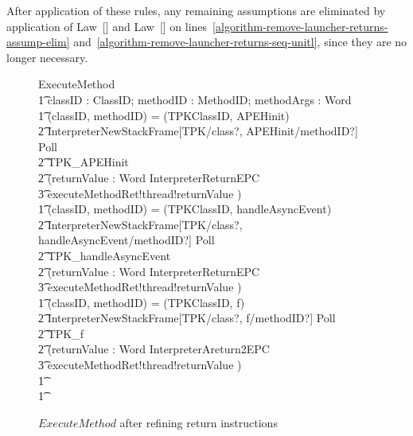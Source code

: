 After application of these rules, any remaining assumptions are
eliminated by application of Law~[] and
Law~[] on
lines~\ref{algorithm-remove-launcher-returns-assump-elim}
and~\ref{algorithm-remove-launcher-returns-seq-unitl}, since they are
no longer necessary.

\begin{figure}[tp!]
  \centering
  \setlength{\zedtab}{0.6cm}
  \begin{circusaction}
    ExecuteMethod \circdef \\
    \t1 \circval classID : ClassID; \circval methodID : MethodID; \circval methodArgs : \seq Word \circspot \\
    \t1 \circif (classID, methodID) = (TPKClassID, APEHinit) \circthen {} \\
    \t2 InterpreterNewStackFrame[TPK/class?, APEHinit/methodID?] \circseq Poll \circseq \\
    \t2 TPK\_APEHinit \circseq \\
    \t2 (\circvar returnValue : Word \circspot \lschexpract InterpreterReturnEPC \rschexpract \circseq \\
    \t3 executeMethodRet!thread!returnValue \then \Skip) \\
    \t1 {} \circelse (classID, methodID) = (TPKClassID, handleAsyncEvent) \circthen {} \\
    \t2 InterpreterNewStackFrame[TPK/class?, handleAsyncEvent/methodID?] \circseq Poll \circseq \\
    \t2 TPK\_handleAsyncEvent \circseq \\
    \t2 (\circvar returnValue : Word \circspot \lschexpract InterpreterReturnEPC \rschexpract \circseq \\
    \t3 executeMethodRet!thread!returnValue \then \Skip) \\
    \t1 {} \circelse (classID, methodID) = (TPKClassID, f) \circthen {} \\
    \t2 InterpreterNewStackFrame[TPK/class?, f/methodID?] \circseq Poll \circseq \\
    \t2 TPK\_f \circseq \\
    \t2 (\circvar returnValue : Word \circspot \lschexpract InterpreterAreturn2EPC \rschexpract \circseq \\
    \t3 executeMethodRet!thread!returnValue \then \Skip) \\
    \t1 {} \cdots {} \\
    \t1 \circfi
  \end{circusaction}
  \caption{$ExecuteMethod$ after refining return instructions}
  \label{efs-ExecutMethod-refined-return-instructions-figure}
\end{figure}

